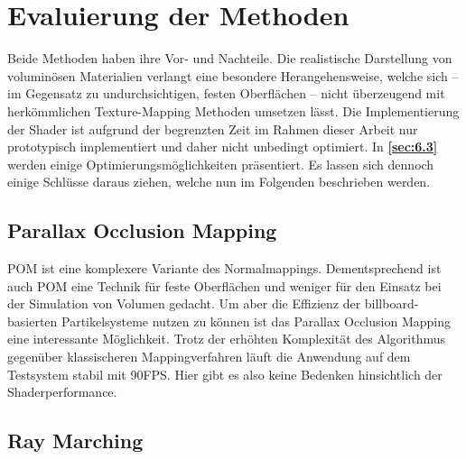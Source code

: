 \section{Evaluierung der Methoden}
\label{sec:5}

Beide Methoden haben ihre Vor- und Nachteile. Die realistische Darstellung von voluminösen Materialien verlangt 
eine besondere Herangehensweise, welche sich – im Gegensatz zu undurchsichtigen, festen Oberflächen – 
nicht überzeugend mit herkömmlichen Texture-Mapping Methoden umsetzen lässt. 
Die Implementierung der Shader ist aufgrund der 
begrenzten Zeit im Rahmen dieser Arbeit nur prototypisch implementiert und daher nicht unbedingt optimiert. 
In \textbf{\autoref{sec:6.3} } werden einige Optimierungsmöglichkeiten präsentiert. 
Es lassen sich dennoch einige Schlüsse daraus ziehen, welche nun im Folgenden beschrieben werden. 


\subsection{Parallax Occlusion Mapping}
\label{sec:5.1}
POM ist eine komplexere Variante des Normalmappings. Dementsprechend ist auch POM eine Technik für feste Oberflächen und weniger
für den Einsatz bei der Simulation von Volumen gedacht. Um aber die Effizienz der billboard-basierten Partikelsysteme 
nutzen zu können ist das Parallax Occlusion Mapping eine interessante Möglichkeit. Trotz der erhöhten Komplexität des Algorithmus
gegenüber klassischeren Mappingverfahren läuft die Anwendung auf dem Testsystem stabil mit 90FPS. Hier gibt es also keine 
Bedenken hinsichtlich der Shaderperformance. 

\subsection{Ray Marching}
\label{sec:5.2}